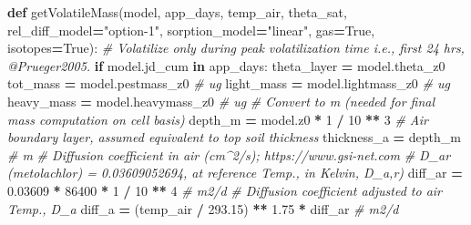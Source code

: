 \documentclass[]{article}
\newenvironment{Shaded}{\begin{snugshade}}{\end{snugshade}}
\newcommand{\KeywordTok}[1]{\textcolor[rgb]{0.13,0.29,0.53}{\textbf{{#1}}}}
\newcommand{\DecValTok}[1]{\textcolor[rgb]{0.00,0.00,0.81}{{#1}}}
\newcommand{\FloatTok}[1]{\textcolor[rgb]{0.00,0.00,0.81}{{#1}}}
\newcommand{\StringTok}[1]{\textcolor[rgb]{0.31,0.60,0.02}{{#1}}}
\newcommand{\CommentTok}[1]{\textcolor[rgb]{0.56,0.35,0.01}{\textit{{#1}}}}
\newcommand{\VariableTok}[1]{\textcolor[rgb]{0.00,0.00,0.00}{{#1}}}
\newcommand{\ControlFlowTok}[1]{\textcolor[rgb]{0.13,0.29,0.53}{\textbf{{#1}}}}
\newcommand{\OperatorTok}[1]{\textcolor[rgb]{0.81,0.36,0.00}{\textbf{{#1}}}}
\newcommand{\NormalTok}[1]{{#1}}
\begin{document}
\begin{Shaded}
\begin{Highlighting}[]

\KeywordTok{def} \NormalTok{getVolatileMass(model, app_days, temp_air, theta_sat,}
                    \NormalTok{rel_diff_model}\OperatorTok{=}\StringTok{"option-1"}\NormalTok{, sorption_model}\OperatorTok{=}\StringTok{"linear"}\NormalTok{,}
                    \NormalTok{gas}\OperatorTok{=}\VariableTok{True}\NormalTok{, isotopes}\OperatorTok{=}\VariableTok{True}\NormalTok{):}
    \CommentTok{# Volatilize only during peak volatilization time i.e., first 24 hrs, @Prueger2005.}
    \ControlFlowTok{if} \NormalTok{model.jd_cum }\OperatorTok{in} \NormalTok{app_days:}
        \NormalTok{theta_layer }\OperatorTok{=} \NormalTok{model.theta_z0}
        \NormalTok{tot_mass }\OperatorTok{=} \NormalTok{model.pestmass_z0  }\CommentTok{# ug}
        \NormalTok{light_mass }\OperatorTok{=} \NormalTok{model.lightmass_z0  }\CommentTok{# ug}
        \NormalTok{heavy_mass }\OperatorTok{=} \NormalTok{model.heavymass_z0  }\CommentTok{# ug}
        \CommentTok{# Convert to m (needed for final mass computation on cell basis)}
        \NormalTok{depth_m }\OperatorTok{=} \NormalTok{model.z0 }\OperatorTok{*} \DecValTok{1} \OperatorTok{/} \DecValTok{10} \OperatorTok{**} \DecValTok{3}
        \CommentTok{# Air boundary layer, assumed equivalent to top soil thickness}
        \NormalTok{thickness_a }\OperatorTok{=} \NormalTok{depth_m  }\CommentTok{# m}
        \CommentTok{# Diffusion coefficient in air (cm^2/s); https://www.gsi-net.com}
        \CommentTok{#  D_ar (metolachlor) = 0.03609052694,  at reference Temp., in Kelvin, D_a,r)}
        \NormalTok{diff_ar }\OperatorTok{=} \FloatTok{0.03609} \OperatorTok{*} \DecValTok{86400} \OperatorTok{*} \DecValTok{1} \OperatorTok{/} \DecValTok{10} \OperatorTok{**} \DecValTok{4}  \CommentTok{# m2/d}
        \CommentTok{# Diffusion coefficient adjusted to air Temp., D_a}
        \NormalTok{diff_a }\OperatorTok{=} \NormalTok{(temp_air }\OperatorTok{/} \FloatTok{293.15}\NormalTok{) }\OperatorTok{**} \FloatTok{1.75} \OperatorTok{*} \NormalTok{diff_ar  }\CommentTok{# m2/d}


\end{Highlighting}
\end{Shaded}
\end{document}
